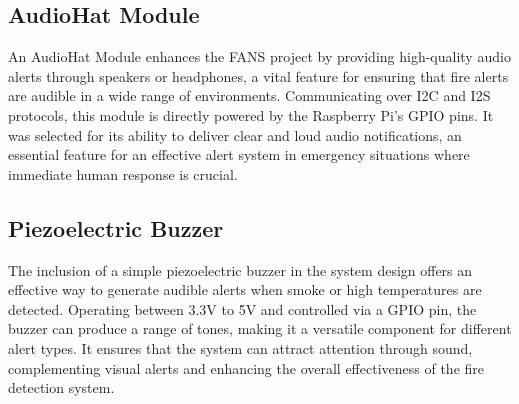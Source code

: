\subsection{AudioHat Module}


An AudioHat Module enhances the FANS project by providing high-quality audio alerts through speakers or headphones, a
vital feature for ensuring that fire alerts are audible in a wide range of environments. Communicating over I2C and I2S
protocols, this module is directly powered by the Raspberry Pi's GPIO pins. It was selected for its ability to deliver
clear and loud audio notifications, an essential feature for an effective alert system in emergency situations where
immediate human response is crucial.

\subsection{Piezoelectric Buzzer}

The inclusion of a simple piezoelectric buzzer in the system design offers an effective way to generate audible alerts
when smoke or high temperatures are detected. Operating between 3.3V to 5V and controlled via a GPIO pin, the buzzer
can produce a range of tones, making it a versatile component for different alert types. It ensures that the system can
attract attention through sound, complementing visual alerts and enhancing the overall effectiveness of the fire
detection system.
